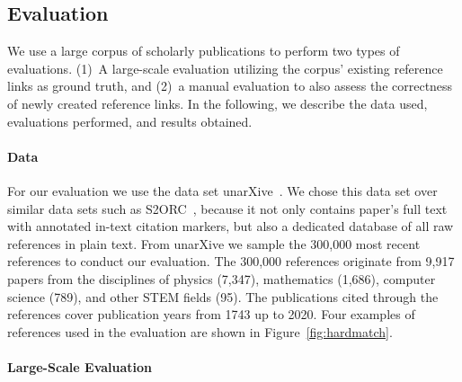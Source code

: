 \subsection{Evaluation}\label{sec:eval}

We use a large corpus of scholarly publications to perform two types of evaluations. (1)~A large-scale evaluation utilizing the corpus' existing reference links as ground truth, and (2)~a manual evaluation to also assess the correctness of newly created reference links. In the following, we describe the data used, evaluations performed, and results obtained.

\paragraph{Data}
For our evaluation we use the data set unarXive~\cite{Saier2020}. We chose this data set over similar data sets such as S2ORC~\cite{Lo2020}, because it not only contains paper's full text with annotated in-text citation markers, but also a dedicated database of all raw references in plain text. From unarXive we sample the 300,000 most recent references to conduct our evaluation. The 300,000 references originate from 9,917 papers from the disciplines of physics (7,347), mathematics (1,686), computer science (789), and other STEM fields (95). The publications cited through the references cover publication years from 1743 up to 2020. Four examples of references used in the evaluation are shown in Figure~\ref{fig:hardmatch}.




\paragraph{Large-Scale Evaluation}

